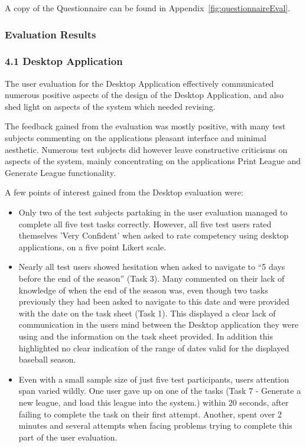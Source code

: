 A copy of the Questionnaire can be found in
Appendix~\ref{fig:questionnaireEval}.

\subsubsection{Evaluation Results}

\subsubsection{4.1 Desktop Application}

The user evaluation for the Desktop Application effectively communicated
numerous positive aspects of the design of the Desktop Application, and also
shed light on aspects of the system which needed revising.

The feedback gained from the evaluation was mostly positive, with many test
subjects commenting on the applications pleasant interface and minimal
aesthetic. Numerous test subjects did however leave constructive criticisms on
aspects of the system, mainly concentrating on the applications Print League
and Generate League functionality.

A few points of interest gained from the Desktop evaluation were:

\begin{itemize}
\item Only two of the test subjects partaking in the user evaluation managed to
complete all five test tasks correctly. However, all five test users rated
themselves 'Very Confident' when asked to rate competency using desktop
applications, on a five point Likert scale.
\item Nearly all test users showed hesitation when asked to navigate to ``5
days before the end of the season'' (Task 3). Many commented on their lack of
knowledge of when the end of the season was, even though two tasks previously
they had been asked to navigate to this date and were provided with the date on
the task sheet (Task 1). This displayed a clear lack of communication in the
users mind between the Desktop application they were using and the information
on the task sheet provided. In addition this highlighted no clear indication of
the range of dates valid for the displayed baseball season.
\item Even with a small sample size of just five test participants, users
attention span varied wildly. One user gave up on one of the tasks (Task 7 -
Generate a new league, and load this league into the system.) within 20
seconds, after failing to complete the task on their first attempt. Another,
spent over 2 minutes and several attempts when facing problems trying to
complete this part of the user evaluation.
\end{itemize}

